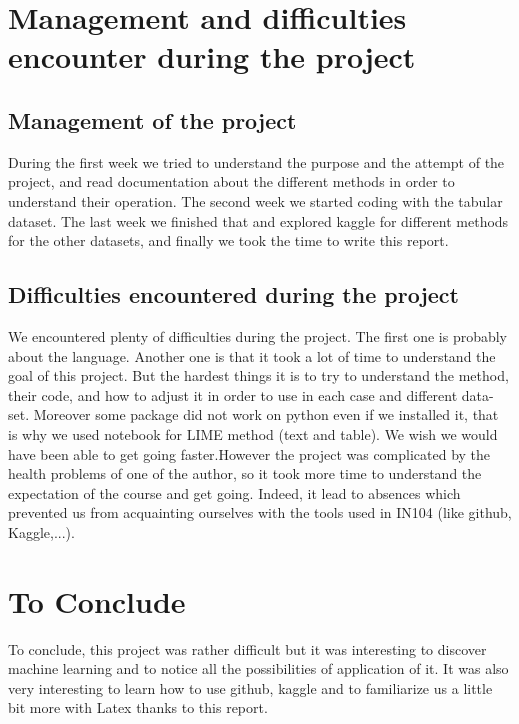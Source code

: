 \documentclass[sigplan,screen]{acmart}
\begin{document}
\section{Management and difficulties encounter during the project}
\subsection{Management of the project}
\Large
During the first week we tried to understand the purpose and the attempt of the project, and read documentation about the different methods in order to understand their operation. The second week we started coding with the tabular dataset. The last week we finished that and explored  kaggle for different methods for the other datasets, and finally we took the time to write this report.

\subsection{Difficulties encountered during the project}
\Large
We encountered plenty of difficulties during the project. The first one is probably about the language. Another one is that it took a lot of time to understand the goal of this project. But the hardest things it is to try to understand the method, their code, and how to adjust it in order to use in each case and different data-set. Moreover some package did not work on python even if we installed it, that is why we used notebook for LIME method (text and table).
We wish we would have been able to get going faster.However the project was complicated by the health problems of one of the author, so it took more time to understand the expectation of the course and get going. Indeed, it lead to absences which prevented us from acquainting ourselves with the tools used in IN104 (like github, Kaggle,...).

\section{To Conclude}
\Large
To conclude, this project was rather difficult but it was interesting to discover machine learning and to notice all the possibilities of application of it. It was also very interesting to learn how to use github, kaggle and to familiarize us a little bit more with Latex thanks to this report.
\end{document}

